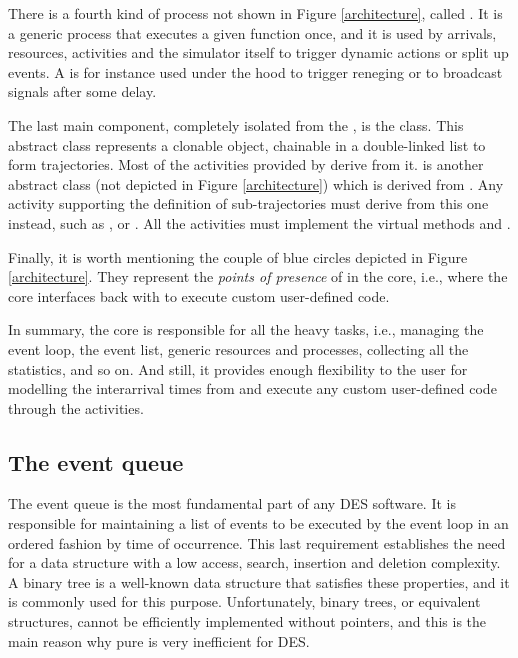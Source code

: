 \documentclass[
  nojss]{jss}
\begin{document}
There is a fourth kind of process not shown in Figure
\ref{architecture}, called . It is a generic process that
executes a given function once, and it is used by arrivals, resources,
activities and the simulator itself to trigger dynamic actions or split
up events. A  is for instance used under the hood to trigger
reneging or to broadcast signals after some delay.

The last main component, completely isolated from the ,
is the  class. This abstract class represents a clonable
object, chainable in a double-linked list to form trajectories. Most of
the activities provided by  derive from it.  is
another abstract class (not depicted in Figure \ref{architecture}) which
is derived from . Any activity supporting the definition
of sub-trajectories must derive from this one instead, such as
,  or . All the activities must
implement the virtual methods  and .

Finally, it is worth mentioning the couple of blue circles depicted in
Figure \ref{architecture}. They represent the \emph{points of presence}
of  in the  core, i.e., where the core
interfaces back with  to execute custom user-defined code.

In summary, the  core is responsible for all the heavy
tasks, i.e., managing the event loop, the event list, generic resources
and processes, collecting all the statistics, and so on. And still, it
provides enough flexibility to the user for modelling the interarrival
times from  and execute any custom user-defined code through
the activities.

\hypertarget{the-event-queue}{%
\subsection{The event queue}\label{the-event-queue}}

The event queue is the most fundamental part of any DES software. It is
responsible for maintaining a list of events to be executed by the event
loop in an ordered fashion by time of occurrence. This last requirement
establishes the need for a data structure with a low access, search,
insertion and deletion complexity. A binary tree is a well-known data
structure that satisfies these properties, and it is commonly used for
this purpose. Unfortunately, binary trees, or equivalent structures,
cannot be efficiently implemented without pointers, and this is the main
reason why pure  is very inefficient for DES.
\end{document}
